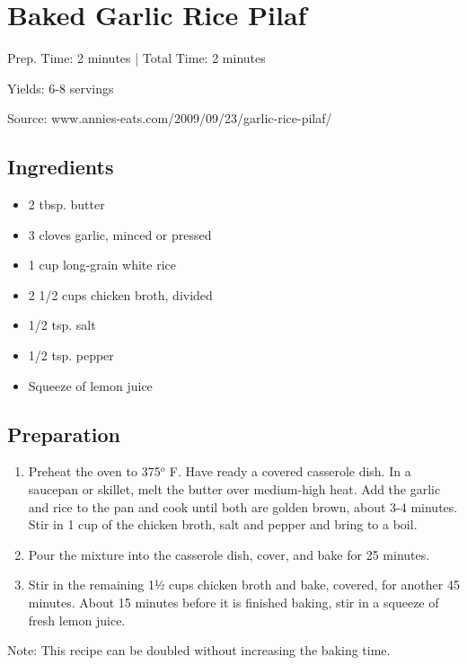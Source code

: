 \section{Baked Garlic Rice Pilaf}

\begin{center}
Prep. Time: 2 minutes |
Total Time: 2 minutes

Yields: 6-8 servings

\vspace{1em}

Source: www.annies-eats.com/2009/09/23/garlic-rice-pilaf/
\end{center}

\subsection{Ingredients}
\begin{itemize}
    \item 2 tbsp. butter
    \item 3 cloves garlic, minced or pressed
    \item 1 cup long-grain white rice
    \item 2 1/2 cups chicken broth, divided
    \item 1/2 tsp. salt
    \item 1/2 tsp. pepper
    \item Squeeze of lemon juice
\end{itemize}

\subsection{Preparation}
\begin{enumerate}
    \item Preheat the oven to 375$^o$ F.  Have ready a covered casserole dish.  In a saucepan or skillet, melt the butter over medium-high heat.  Add the garlic and rice to the pan and cook until both are golden brown, about 3-4 minutes.  Stir in 1 cup of the chicken broth, salt and pepper and bring to a boil.
    \item Pour the mixture into the casserole dish, cover, and bake for 25 minutes.
    \item Stir in the remaining 1½ cups chicken broth and bake, covered, for another 45 minutes.  About 15 minutes before it is finished baking, stir in a squeeze of fresh lemon juice.

\end{enumerate}

Note: This recipe can be doubled without increasing the baking time.
